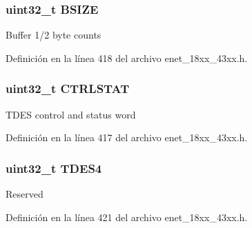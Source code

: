 \subsubsection[{\texorpdfstring{B\+S\+I\+ZE}{BSIZE}}]{ uint32\+\_\+t B\+S\+I\+ZE}\hypertarget{struct_e_n_e_t___e_n_h_t_x_d_e_s_c___t_af2098998d1719cc4a2e9ba78fb835a90}{}\label{struct_e_n_e_t___e_n_h_t_x_d_e_s_c___t_af2098998d1719cc4a2e9ba78fb835a90}
Buffer 1/2 byte counts 

Definición en la línea 418 del archivo enet\+\_\+18xx\+\_\+43xx.\+h.

\subsubsection[{\texorpdfstring{C\+T\+R\+L\+S\+T\+AT}{CTRLSTAT}}]{ uint32\+\_\+t C\+T\+R\+L\+S\+T\+AT}\hypertarget{struct_e_n_e_t___e_n_h_t_x_d_e_s_c___t_a57ef6fedebbfbb6aa9f765be71c15dbb}{}\label{struct_e_n_e_t___e_n_h_t_x_d_e_s_c___t_a57ef6fedebbfbb6aa9f765be71c15dbb}
T\+D\+ES control and status word 

Definición en la línea 417 del archivo enet\+\_\+18xx\+\_\+43xx.\+h.

\subsubsection[{\texorpdfstring{T\+D\+E\+S4}{TDES4}}]{ uint32\+\_\+t T\+D\+E\+S4}\hypertarget{struct_e_n_e_t___e_n_h_t_x_d_e_s_c___t_ab915578dc498ac976b70b4f2f78e6e98}{}\label{struct_e_n_e_t___e_n_h_t_x_d_e_s_c___t_ab915578dc498ac976b70b4f2f78e6e98}
Reserved 

Definición en la línea 421 del archivo enet\+\_\+18xx\+\_\+43xx.\+h.


